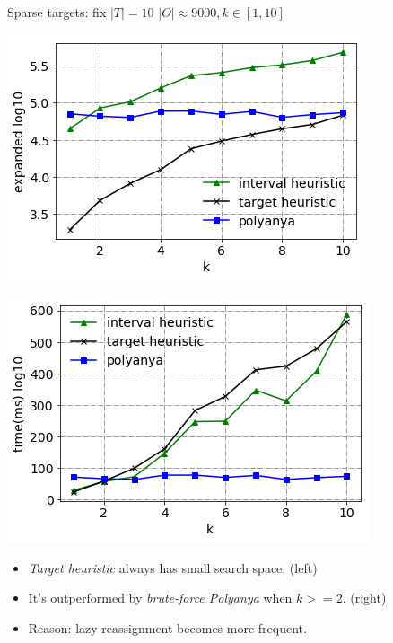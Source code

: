 \begin{frame}{Sparse targets: fix $|T|=10$}
\centering
$\scriptscriptstyle |O| \approx 9000, k \in [1, 10]$
\begin{minipage}{.5\textwidth}
    \begin{adjustbox}{max totalsize={.9\textwidth}{.9\textheight}, right}
    \centering
    \includegraphics{pic/e2_sparse_gen.png}
    \end{adjustbox}
\end{minipage}%
\begin{minipage}{.5\textwidth}
    \begin{adjustbox}{max totalsize={.9\textwidth}{.9\textheight}, right}
    \centering
    \includegraphics{pic/e2_sparse_time.png}
    \end{adjustbox}
\end{minipage}
\begin{itemize}
    \item \small{\textit{Target heuristic} always has small search space. (left)}
    \item \small{It's outperformed by \textit{brute-force Polyanya} when $k>=2$. (right)}
    \item \small{Reason: lazy reassignment becomes more frequent.}
\end{itemize}
\end{frame}

